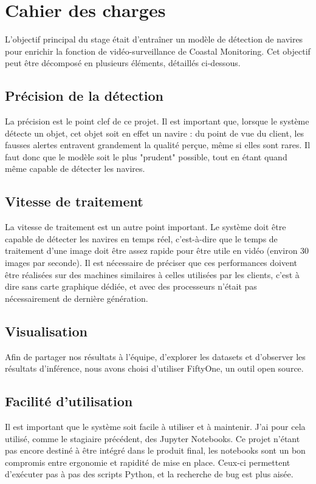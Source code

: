 \chapter{Cahier des charges}

L'objectif principal du stage était d'entraîner un modèle de détection
de navires pour enrichir la fonction de vidéo-surveillance de Coastal Monitoring.
Cet objectif peut être décomposé en plusieurs éléments, détaillés ci-dessous.

\section{Précision de la détection}

La précision est le point clef de ce projet. Il est important que, lorsque le
système détecte un objet, cet objet soit en effet un navire : du point de vue du client,
les fausses alertes entravent grandement la qualité perçue, même si elles sont rares.
Il faut donc que le modèle soit le plus "prudent" possible, tout en étant quand même
capable de détecter les navires.

\section{Vitesse de traitement}

La vitesse de traitement est un autre point important. Le système doit être capable
de détecter les navires en temps réel, c'est-à-dire que le temps de traitement d'une image
doit être assez rapide pour être utile en vidéo (environ 30 images par seconde).
Il est nécessaire de préciser que ces performances doivent être réalisées sur
des machines similaires à celles utilisées par les clients, c'est à dire sans
carte graphique dédiée, et avec des processeurs n'était pas nécessairement de
dernière génération.

\section{Visualisation}

Afin de partager nos résultats à l'équipe, d'explorer les datasets et d'observer les résultats
d'inférence, nous avons choisi d'utiliser FiftyOne, un outil open source.

\section{Facilité d'utilisation\label{facilite_utilisation}}

Il est important que le système soit facile à utiliser et à maintenir.
J'ai pour cela utilisé, comme le stagiaire précédent, des Jupyter Notebooks.
Ce projet n'étant pas encore destiné à être intégré dans le produit final,
les notebooks sont un bon compromis entre ergonomie et rapidité de mise en place.
Ceux-ci permettent d'exécuter pas à pas des scripts Python,
et la recherche de bug est plus aisée.
